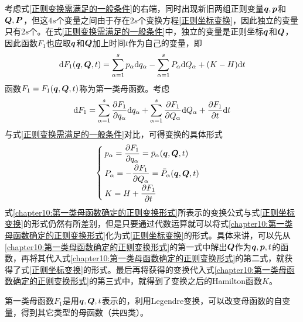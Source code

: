考虑式\eqref{正则变换需满足的一般条件}的右端，同时出现新旧两组正则变量$\boldsymbol{q},\boldsymbol{p}$和$\boldsymbol{Q},\boldsymbol{P}$，但这$4s$个变量之间由于存在$2s$个变换方程\eqref{正则坐标变换}，因此独立的变量只有$2s$个。在式\eqref{正则变换需满足的一般条件}中，独立的变量是正则坐标$\boldsymbol{q}$和$\boldsymbol{Q}$，因此函数$F_1$也应取$\boldsymbol{q}$和$\boldsymbol{Q}$加上时间$t$作为自己的变量，即
\begin{equation}
	\mathrm{d} F_1(\boldsymbol{q},\boldsymbol{Q},t) = \sum_{\alpha=1}^s p_\alpha \mathrm{d} q_\alpha - \sum_{\alpha=1}^s P_\alpha \mathrm{d} Q_\alpha + (K-H) \mathrm{d} t
	\label{第一类母函数下的正则变换}
\end{equation}
函数$F_1 = F_1(\boldsymbol{q},\boldsymbol{Q},t)$称为{\heiti 第一类母函数}。考虑
\begin{equation}
	\mathrm{d} F_1 = \sum_{\alpha=1}^s \frac{\partial F_1}{\partial q_\alpha} \mathrm{d} q_\alpha + \sum_{\alpha=1}^s \frac{\partial F_1}{\partial Q_\alpha} \mathrm{d} Q_\alpha + \frac{\partial F_1}{\partial t} \mathrm{d} t
\end{equation}
与式\eqref{正则变换需满足的一般条件}对比，可得变换的具体形式
\begin{equation}
	\begin{cases}
		\displaystyle p_\alpha = \frac{\partial F_1}{\partial q_\alpha} = \bar{p}_\alpha(\boldsymbol{q},\boldsymbol{Q},t) \\[1.5ex]
		\displaystyle P_\alpha = -\frac{\partial F_1}{\partial Q_\alpha} = \bar{P}_\alpha(\boldsymbol{q},\boldsymbol{Q},t) \\[1.5ex]
		\displaystyle K = H+\frac{\partial F_1}{\partial t}
	\end{cases}
	\label{chapter10:第一类母函数确定的正则变换形式}
\end{equation}
式\eqref{chapter10:第一类母函数确定的正则变换形式}所表示的变换公式与式\eqref{正则坐标变换}的形式仍然有所差别，但是只要通过代数运算就可以将式\eqref{chapter10:第一类母函数确定的正则变换形式}化为式\eqref{正则坐标变换}的形式。具体来讲，可以先从\eqref{chapter10:第一类母函数确定的正则变换形式}的第一式中解出$\boldsymbol{Q}$作为$\boldsymbol{q},\boldsymbol{p},t$的函数，再将其代入式\eqref{chapter10:第一类母函数确定的正则变换形式}的第二式，就获得了式\eqref{正则坐标变换}的形式。最后再将获得的变换代入式\eqref{chapter10:第一类母函数确定的正则变换形式}的第三式中，就得到了变换之后的Hamilton函数$K$。


第一类母函数$F_1$是用$\boldsymbol{q},\boldsymbol{Q},t$表示的，利用Legendre变换，可以改变母函数的自变量，得到其它类型的母函数（共四类）。

